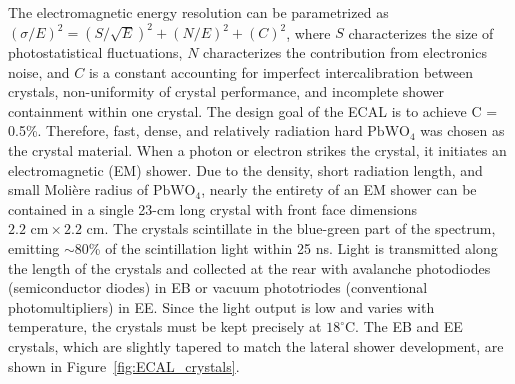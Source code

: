 \documentclass[dissertation.tex]{subfiles}
\begin{document}
The electromagnetic energy resolution can be parametrized as $(\sigma/E)^{2} = (S/\sqrt{E})^{2} + (N/E)^{2} + (C)^{2}$, where $S$ characterizes the size of photostatistical fluctuations, $N$ characterizes the contribution from electronics noise, and $C$ is a constant accounting for imperfect intercalibration between crystals, non-uniformity of crystal performance, and incomplete shower containment within one crystal.  The design goal of the ECAL is to achieve C = 0.5\%.  Therefore, fast, dense, and relatively radiation hard $\mbox{PbWO}_{4}$ was chosen as the crystal material.  When a photon or electron strikes the crystal, it initiates an electromagnetic (EM) shower.  Due to the density, short radiation length, and small Moli\`ere radius of $\mbox{PbWO}_{4}$, nearly the entirety of an EM shower can be contained in a single 23-cm long crystal with front face dimensions $2.2\mbox{ cm}\times2.2\mbox{ cm}$.  The crystals scintillate in the blue-green part of the spectrum, emitting $\sim80$\% of the scintillation light within 25 ns.  Light is transmitted along the length of the crystals and collected at the rear with avalanche photodiodes (semiconductor diodes) in EB or vacuum phototriodes (conventional photomultipliers) in EE.  Since the light output is low and varies with temperature, the crystals must be kept precisely at $18^{\circ}$C.  The EB and EE crystals, which are slightly tapered to match the lateral shower development, are shown in Figure~\ref{fig:ECAL_crystals}.
\end{document}
